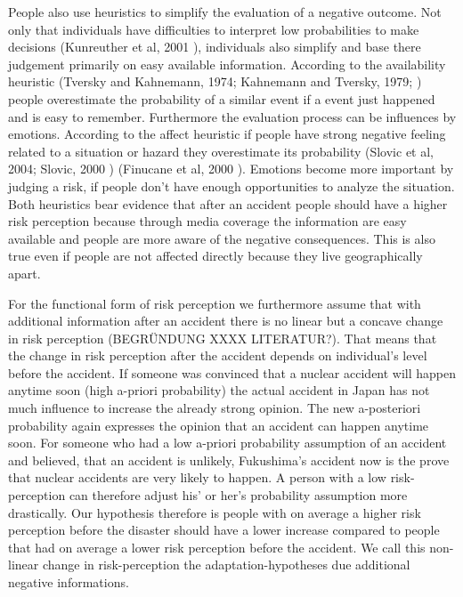 People also use heuristics to simplify the evaluation of a negative outcome. Not only that individuals have difficulties to interpret low probabilities to make decisions (Kunreuther et al, 2001 \citep{Kunreuther:2001dj}),   individuals also simplify and base there judgement primarily on easy available information. According to the availability heuristic  (Tversky and Kahnemann, 1974; Kahnemann and Tversky, 1979; \citep{Tversky:1974wi,Tversky:1973ui, kahnemann_prospect_1979}) people overestimate the probability of a similar event if a event just happened and is easy to remember. Furthermore the evaluation process can be influences by emotions. According to the affect heuristic if people have strong negative feeling related to a situation or hazard they overestimate its probability (Slovic et al, 2004; Slovic, 2000 \citep{Slovic:2004hj}\citep{Slovic:2000tx}) (Finucane et al, 2000 \citep{Finucane:2000wu}). Emotions become more important by judging a risk, if people don't have enough opportunities to analyze the situation. Both heuristics bear evidence that after an accident people should have a higher risk perception because through media coverage the information are easy available and people are more aware of the negative consequences. This is also true even if people are not affected directly because they live geographically apart.          



For the functional form of risk perception we furthermore assume that with additional information after an accident there is no linear but a concave change in risk perception (BEGRÜNDUNG XXXX LITERATUR?).  That means that the change in risk perception after the accident depends on individual's level before the accident. If someone was convinced that a nuclear accident will happen anytime soon (high a-priori probability) the actual accident in Japan has not much influence to increase the already strong opinion. The new a-posteriori probability again expresses the opinion that an accident can happen anytime soon. For someone who had a low a-priori probability assumption of an accident and believed, that an accident is unlikely, Fukushima's accident now is the prove that nuclear accidents are very likely to happen. A person with a low risk-perception can therefore adjust his' or her's probability assumption more drastically. Our hypothesis therefore is people with on average a higher risk perception before the disaster should have a lower increase  compared to people that had on average a lower risk perception before the accident. 
We call this non-linear change in risk-perception the adaptation-hypotheses due additional negative informations.

